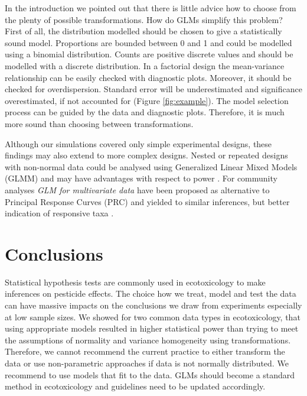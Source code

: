 \documentclass{scrartcl}
\begin{document}
In the introduction we pointed out that there is little advice how to choose from the plenty of possible transformations.
How do GLMs simplify this problem?
First of all, the distribution modelled should be chosen to give a statistically sound model.
Proportions are bounded between 0 and 1 and could be modelled using a binomial distribution.
Counts are positive discrete values and should be modelled with a discrete distribution.
In a factorial design the mean-variance relationship can be easily checked with diagnostic plots.
Moreover, it should be checked for overdispersion. 
Standard error will be underestimated and significance overestimated, if not accounted for (Figure \ref{fig:example}).
The model selection process can be guided by the data and diagnostic plots. Therefore, it is much more sound than choosing between transformations.


Although our simulations covered only simple experimental designs, these findings may also extend to more complex designs. 
Nested or repeated designs with non-normal data could be analysed using Generalized Linear Mixed Models (GLMM) and may have advantages with respect to power \citep{stroup_rethinking_2014}.
For community analyses \emph{GLM for multivariate data} have been proposed as alternative to Principal Response Curves (PRC) and yielded to similar inferences, but better indication of responsive taxa \citep{warton_distance-based_2012,szocs_analysing_2015}.



\newpage
\section{Conclusions}
Statistical hypothesis tests are commonly used in ecotoxicology to make inferences on pesticide effects.
The choice how we treat, model and test the data can have massive impacts on the conclusions we draw from experiments especially at low sample sizes.
We showed for two common data types in ecotoxicology, that using appropriate models resulted in higher statistical power than trying to meet the assumptions of normality and variance homogeneity using transformations. 
Therefore, we cannot recommend the current practice to either transform the data or use non-parametric approaches if data is not normally distributed.
We recommend to use models that fit to the data. 
GLMs should become a standard method in ecotoxicology and guidelines need to be updated accordingly.



\newpage


\end{document}
